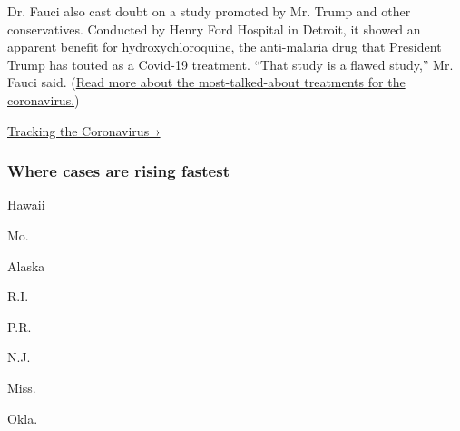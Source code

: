 Dr. Fauci also cast doubt on a study promoted by Mr. Trump and other
conservatives. Conducted by Henry Ford Hospital in Detroit, it showed an
apparent benefit for hydroxychloroquine, the anti-malaria drug that
President Trump has touted as a Covid-19 treatment. ``That study is a
flawed study,'' Mr. Fauci said.
(\href{https://www.nytimes.com/interactive/2020/science/coronavirus-drugs-treatments.html}{Read
more about the most-talked-about treatments for the coronavirus.})

\href{https://www.nytimes.com/interactive/2020/us/coronavirus-us-cases.html}{Tracking
the Coronavirus~›}

\href{https://www.nytimes.com/interactive/2020/us/coronavirus-us-cases.html}{}

\hypertarget{where-cases-are-rising-fastest}{%
\subsubsection{\texorpdfstring{Where cases are \textbf{rising}
fastest}{Where cases are rising fastest}}\label{where-cases-are-rising-fastest}}

\href{https://www.nytimes.com/interactive/2020/us/hawaii-coronavirus-cases.html}{}

Hawaii

\href{https://www.nytimes.com/interactive/2020/us/missouri-coronavirus-cases.html}{}

Mo.

\href{https://www.nytimes.com/interactive/2020/us/alaska-coronavirus-cases.html}{}

Alaska

\href{https://www.nytimes.com/interactive/2020/us/rhode-island-coronavirus-cases.html}{}

R.I.

\href{https://www.nytimes.com/interactive/2020/us/puerto-rico-coronavirus-cases.html}{}

P.R.

\href{https://www.nytimes.com/interactive/2020/us/new-jersey-coronavirus-cases.html}{}

N.J.

\href{https://www.nytimes.com/interactive/2020/us/mississippi-coronavirus-cases.html}{}

Miss.

\href{https://www.nytimes.com/interactive/2020/us/oklahoma-coronavirus-cases.html}{}

Okla.

\href{https://www.nytimes.com/interactive/2020/us/maryland-coronavirus-cases.html}{}

